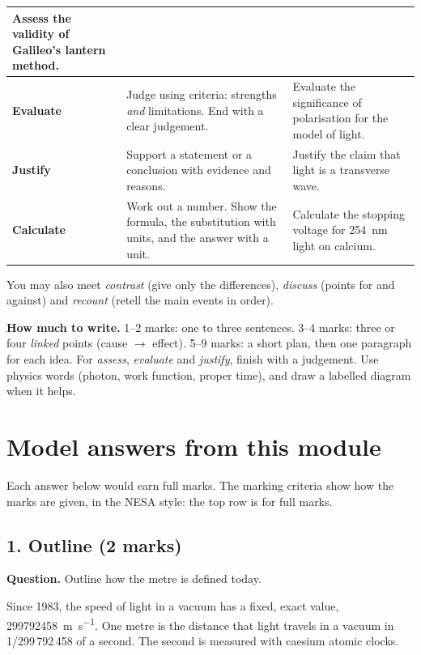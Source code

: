 {\begin{longtable}{@{}L{18mm}@{\hspace{3mm}}L{66mm}@{\hspace{3mm}}L{60mm}@{}}
    Assess the validity of Galileo's lantern method.\\\hline
  \textbf{Evaluate} & Judge using criteria: strengths \emph{and} limitations. End with a clear
    judgement. & Evaluate the significance of polarisation for the model of light.\\\hline
  \textbf{Justify} & Support a statement or a conclusion with evidence and reasons. & Justify
    the claim that light is a transverse wave.\\\hline
  \textbf{Calculate} & Work out a number. Show the formula, the substitution with units, and
    the answer with a unit. & Calculate the stopping voltage for \qty{254}{nm} light on
    calcium.\\\hline
\end{longtable}}

You may also meet \emph{contrast} (give only the differences), \emph{discuss} (points for and
against) and \emph{recount} (retell the main events in order).

\textbf{How much to write.} 1--2 marks: one to three sentences. 3--4 marks: three or four
\emph{linked} points (cause $\to$ effect). 5--9 marks: a short plan, then one paragraph for
each idea. For \emph{assess}, \emph{evaluate} and \emph{justify}, finish with a judgement.
Use physics words (photon, work function, proper time), and draw a labelled diagram when it
helps.

\section*{Model answers from this module}

Each answer below would earn full marks. The marking criteria show how the marks are given,
in the NESA style: the top row is for full marks.

\subsection*{1. Outline (2 marks)}
\textbf{Question.} Outline how the metre is defined today.

\begin{modelanswer}
Since 1983, the speed of light in a vacuum has a fixed, exact value,
\qty{299792458}{m.s^{-1}}. One metre is the distance that light travels in a vacuum in
1/299\,792\,458 of a second. The second is measured with caesium atomic clocks.
\end{modelanswer}
\begin{markingcriteria}
\end{markingcriteria}

